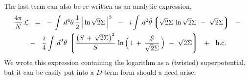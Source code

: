 \documentclass[epsfig,12pt]{article}
\newcommand{\cell}{{\mathcal L}}
\newcommand{\lgr}{\left\lgroup}
\newcommand{\rgr}{\right\rgroup}
\begin{document}
	The last term can also be re-written as an analytic expression,
\begin{align}
%
\notag
	\frac{4\pi}{N}\, \cell &    ~~=~~     
			-\,
			\int\, d^4\theta\, \frac{1}{2}\, \Big| \ln \sqrt{2}\Sigma \, \Big|^2
			~~-~~
			i \int\, d^2\tilde\theta 
			\lgr
			\sqrt{2}\Sigma\, \ln \sqrt{2}\Sigma  ~-~ \sqrt{2}\Sigma
			\rgr
			~~-
	\\
%
			&
			-~~ 
			\frac{i}{4} \int\, d^2\tilde\theta\,
			\lgr \frac{ \big( S \,+\, \sqrt{2}\Sigma \big)^2 }{ S }\,
				\ln \Big(\, 1 \,+\, \frac{S}{\sqrt{2}\Sigma} \,\Big) ~-~
				\sqrt{2}\Sigma \rgr
			~~+~~ \text{h.c.}
\end{align}
	We wrote this expression containing the logarithm as a (twisted) superpotential, but
	it can be easily put into a $ D $-term form should a need arise.
\end{document}
